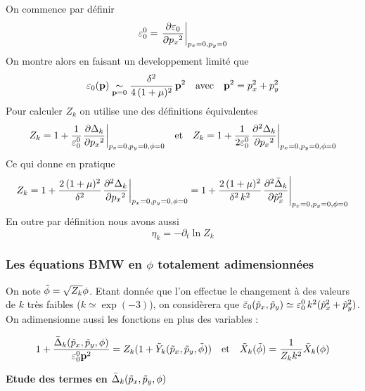 \documentclass[10.5pt]{article}
\begin{document}
On commence par définir 
\begin{equation}
\varepsilon_0^0 ={\left. \frac{\partial \varepsilon_0}{ \partial {{p_x}^2}} \right|}_{p_x = 0, p_y = 0}
\end{equation}
On montre alors en faisant un developpement limité que
\begin{equation}
\varepsilon_0({\bf p})  \underset{{\bf p} = 0}{\sim} \frac{\delta^2}{4\,(1+\mu)^2} \, {\bf p}^2 \quad \text{avec} \quad {\bf p}^2 = p_x^2 + p_y^2
\end{equation}
Pour calculer $Z_k$ on utilise une des définitions équivalentes
\begin{equation}
Z_k = 1+\frac{1}{\varepsilon_0^0}{\left. \frac{\partial \Delta_k}{\partial {p_x}^2} \right|}_{p_x = 0, p_y = 0, \phi = 0}  \quad \text{et} \quad 
Z_k = 1+\frac{1}{2\varepsilon_0^0}{\left. \frac{\partial^2 \Delta_k}{\partial {p_x}^2} \right|}_{p_x = 0, p_y = 0, \phi = 0} 
\end{equation}
Ce qui donne en pratique
\begin{equation}
Z_k = 1+\frac{2\,(1+\mu)^2}{\delta^2}{\left. \frac{\partial^2 \Delta_k}{\partial {p_x}^2} \right|}_{p_x = 0, p_y = 0, \phi = 0} = 1+\frac{2\,(1+\mu)^2}{\delta^2\, k^2}{\left. \frac{\partial^2 \bar{\Delta}_k}{\partial {\tilde{p}_x}^2} \right|}_{p_x = 0, p_y = 0, \phi = 0}
\end{equation}
En outre par définition nous avons aussi
\begin{equation}
\eta_k = -\partial_t \ln Z_k 
\end{equation}

\vspace*{11pt}
\subsubsection{Les équations BMW en $\phi$ totalement adimensionnées}

On note $\tilde{\phi} = \sqrt{Z_k}\phi$. Etant donnée que l'on effectue le changement à des valeurs de $k$ très faibles ($k \simeq \exp(-3)$), on considèrera que $\bar{\varepsilon}_0(\tilde{p}_x,\tilde{p}_y) \simeq \varepsilon_0^0\,k^2(\tilde{p}_x^2+\tilde{p}_y^2)$. On adimensionne aussi les fonctions en plus des variables :

\begin{equation*}
1 + \frac{\bar{\Delta}_k(\tilde{p}_x, \tilde{p}_y,\phi)}{\varepsilon_0^0 {\bf p}^2} = Z_k(1+\tilde{Y}_k(\tilde{p}_x, \tilde{p}_y,\tilde{\phi})) \quad \text{et} \quad \tilde{X}_k(\tilde{\phi}) = \frac{1}{Z_k k^2} \bar{X}_k(\phi)
\end{equation*}


\vspace*{11pt}
\noindent
\textbf{Etude des termes en $\bar{\Delta}_k(\tilde{p}_x, \tilde{p}_y,\phi)$} \\
\end{document}
